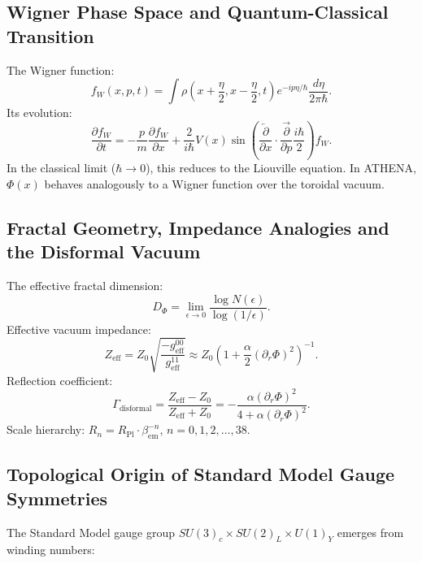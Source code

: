 \documentclass[12pt, a4paper]{article}
\begin{document}
\subsection{Wigner Phase Space and Quantum-Classical Transition}
\label{sec:wigner}
The Wigner function:
\begin{equation}
f_W(x,p,t) = \int \rho\left(x + \frac{\eta}{2}, x - \frac{\eta}{2}, t\right) e^{-ip\eta/\hbar} \frac{d\eta}{2\pi\hbar}.
\label{eq:wigner}
\end{equation}
Its evolution:
\begin{equation}
\frac{\partial f_W}{\partial t} = -\frac{p}{m} \frac{\partial f_W}{\partial x} + \frac{2}{i\hbar} V(x) \sin\left( \frac{\overleftarrow{\partial}}{\partial x} \cdot \frac{\overrightarrow{\partial}}{\partial p} \frac{i\hbar}{2} \right) f_W.
\label{eq:wigner_evolution}
\end{equation}
In the classical limit ($\hbar \to 0$), this reduces to the Liouville equation. In ATHENA, $\Phi(x)$ behaves analogously to a Wigner function over the toroidal vacuum.

\subsection{Fractal Geometry, Impedance Analogies and the Disformal Vacuum}
\label{sec:fractal}
The effective fractal dimension:
\begin{equation}
D_\Phi = \lim_{\epsilon \to 0} \frac{\log N(\epsilon)}{\log(1/\epsilon)}.
\label{eq:fractal_dim}
\end{equation}
Effective vacuum impedance:
\begin{equation}
Z_{\mathrm{eff}} = Z_0 \sqrt{\frac{-g_{\mathrm{eff}}^{00}}{g_{\mathrm{eff}}^{11}}} \approx Z_0 \left(1 + \frac{\alpha}{2} (\partial_r \Phi)^2 \right)^{-1}.
\label{eq:impedance}
\end{equation}
Reflection coefficient:
\begin{equation}
\Gamma_{\mathrm{disformal}} = \frac{Z_{\mathrm{eff}} - Z_0}{Z_{\mathrm{eff}} + Z_0} = -\frac{\alpha(\partial_r \Phi)^2}{4 + \alpha(\partial_r \Phi)^2}.
\label{eq:reflection}
\end{equation}
Scale hierarchy: $R_n = R_{\mathrm{Pl}} \cdot \beta_{\mathrm{em}}^{-n}$, $n = 0,1,2,\dots,38$.

\subsection{Topological Origin of Standard Model Gauge Symmetries}
\label{sec:sm_gauge}
The Standard Model gauge group $SU(3)_c \times SU(2)_L \times U(1)_Y$ emerges from winding numbers:
\end{document}
